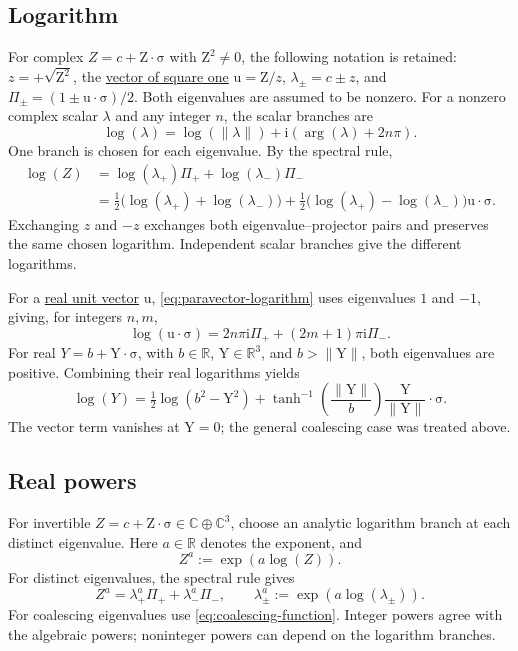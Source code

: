 \documentclass[11pt]{article}
\newcommand{\pv}[1]{{#1}}
\newcommand{\pvGreek}[1]{{#1}}
\newcommand{\vstyle}[1]{{\bm{\mathrm{#1}}}}
\newcommand{\pY}{\pv{Y}}
\newcommand{\pZ}{\pv{Z}}
\newcommand{\pvPi}{\pvGreek{\Pi}}
\numberwithin{equation}{section}
\newcommand{\R}{\mathbb{R}}
\newcommand{\C}{\mathbb{C}}
\newcommand{\ii}{\mathrm{i}}
\newcommand{\dotprod}{\cdot}
\newcommand{\bsig}{\vstyle{\sigma}}
\newcommand{\bY}{\vstyle{Y}}
\newcommand{\bZ}{\vstyle{Z}}
\newcommand{\bu}{\vstyle{u}}
\begin{document}
\subsection{Logarithm}
For complex $\pZ=c+\bZ\dotprod\bsig$ with $\bZ^2\ne0$, the following notation is retained:
$z=+\sqrt{\bZ^2}$, the \hyperref[eq:bilinear-unit-vector]{vector of square one}
$\bu=\bZ/z$, $\lambda_\pm=c\pm z$, and
$\pvPi_\pm=(1\pm\bu\dotprod\bsig)/2$.  Both eigenvalues are assumed to be nonzero.
For a nonzero complex scalar $\lambda$ and any integer $n$, the scalar branches are
\[
 \log(\lambda)=\log(\lVert\lambda\rVert)+\ii(\arg(\lambda)+2n\pi).
\]
One branch is chosen for each eigenvalue. By the spectral rule,
\begin{equation}
 \begin{aligned}
 \log(\pZ)&=\log(\lambda_+)\pvPi_++\log(\lambda_-)\pvPi_-\\
 &=\tfrac12\bigl(\log(\lambda_+)+\log(\lambda_-)\bigr)
 +\tfrac12\bigl(\log(\lambda_+)-\log(\lambda_-)\bigr)\bu\dotprod\bsig.
 \end{aligned}
 \label{eq:paravector-logarithm}
\end{equation}
Exchanging $z$ and $-z$ exchanges both eigenvalue--projector pairs and
preserves the same chosen logarithm.  Independent scalar branches give
the different logarithms.

For a \hyperref[def:real-unit-vector]{real unit vector} $\bu$,
\eqref{eq:paravector-logarithm} uses
eigenvalues $1$ and $-1$, giving, for integers $n,m$,
\begin{equation*}
 \log(\bu\dotprod\bsig)
 =2n\pi\ii\pvPi_++(2m+1)\pi\ii\pvPi_-.
\end{equation*}
For real $\pY=b+\bY\dotprod\bsig$, with $b\in\R$, $\bY\in\R^3$, and
$b>\lVert\bY\rVert$, both eigenvalues are positive.  Combining their real
logarithms yields
\begin{equation*}
 \log(\pY)=\tfrac12\log(b^2-\bY^2)
 +\tanh^{-1}\left(\frac{\lVert\bY\rVert}{b}\right)
       \frac{\bY}{\lVert\bY\rVert}\dotprod\bsig.
\end{equation*}
The vector term vanishes at $\bY=0$; the general coalescing case
was treated above.

\subsection{Real powers}
\label{sec:real-powers}

For invertible $\pZ=c+\bZ\dotprod\bsig\in\C\oplus\C^3$, choose an
analytic logarithm branch at each distinct eigenvalue. Here $a\in\R$
denotes the exponent, and
\begin{equation}
 \boxed{\pZ^a:=\exp(a\log(\pZ)).}
 \label{eq:real-power-definition}
\end{equation}
For distinct eigenvalues, the spectral rule gives
\[
 \pZ^a=\lambda_+^a\pvPi_++\lambda_-^a\pvPi_-,\qquad
 \lambda_\pm^a:=\exp(a\log(\lambda_\pm)).
\]
For coalescing eigenvalues use \eqref{eq:coalescing-function}.
Integer powers agree with the algebraic powers; noninteger powers
can depend on the logarithm branches.
\end{document}

